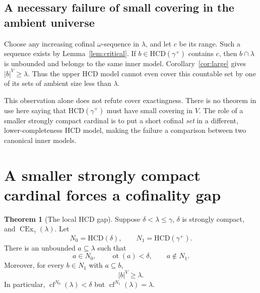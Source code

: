 \documentclass[11pt,letterpaper]{article}
\theoremstyle{definition}
\newtheorem{theorem}[definition]{Theorem}
\newcommand{\CEx}{\operatorname{CEx}}
\newcommand{\cf}{\operatorname{cf}}
\newcommand{\ot}{\operatorname{ot}}
\newcommand{\HCD}{\mathrm{HCD}}
\begin{document}
\subsection{A necessary failure of small covering in the ambient universe}

Choose any increasing cofinal $\omega$-sequence in $\lambda$, and let $c$ be
its range. Such a sequence exists by Lemma~\ref{lem:critical}. If
$b\in\HCD(\gamma^+)$ contains $c$, then $b\cap\lambda$ is unbounded and belongs
to the same inner model. Corollary~\ref{cor:large} gives $|b|^V\geq\lambda$.
Thus the upper HCD model cannot even cover this countable set by one of its
sets of ambient size less than $\lambda$.

This observation alone does not refute cover exactingness. There is no theorem
in use here saying that $\HCD(\gamma^+)$ must have small covering in $V$.
The role of a smaller strongly compact cardinal is to put a short cofinal
\emph{set} in a different, lower-completeness HCD model, making the failure a
comparison between two canonical inner models.

\section{A smaller strongly compact cardinal forces a cofinality gap}
\label{sec:below}

\begin{theorem}[The local HCD gap]\label{thm:gap}
Suppose $\delta<\lambda\leq\gamma$, $\delta$ is strongly compact, and
$\CEx_\gamma(\lambda)$. Let
\[
 N_0=\HCD(\delta),\qquad N_1=\HCD(\gamma^+).
\]
There is an unbounded $a\subseteq\lambda$ such that
\begin{equation}\label{eq:a-gap}
 a\in N_0,\qquad \ot(a)<\delta,\qquad a\notin N_1.
\end{equation}
Moreover, for every $b\in N_1$ with $a\subseteq b$,
\begin{equation}\label{eq:no-small-cover}
 |b|^V\geq\lambda.
\end{equation}
In particular, $\cf^{N_0}(\lambda)<\delta$ but $\cf^{N_1}(\lambda)=\lambda$.
\end{theorem}
\end{document}
